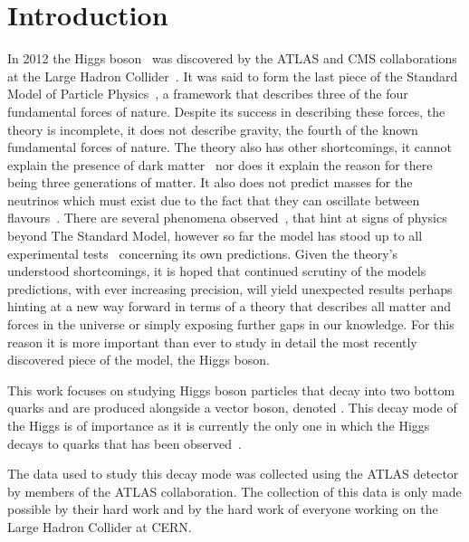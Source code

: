 \chapter{Introduction}%
\label{ch:intro}

In 2012 the Higgs boson~\cite{Brout-Englert, Higgs:1964, Kibble} was discovered
by the ATLAS and CMS collaborations at the Large Hadron
Collider~\cite{DiscoHiggsATLAS, DiscoHiggsCMS}. It was said to form the last
piece of the Standard Model of Particle Physics~\cite{Glashow1959, Salam:1968,
Weinberg:1967, GellMann:1962}, a framework that describes three of the four
fundamental forces of nature. Despite its success in describing these forces,
the theory is incomplete, it does not describe gravity, the fourth of the known
fundamental forces of nature. The theory also has other shortcomings, it cannot
explain the presence of dark matter~\cite{DM-ev-sloan, DM-ev-nucleosynth,
  DM-ev-supernova, DM-ev-scaffold, DM-ev-direct, DM-ev-strong-lens,
  DM-ev-candidates, DM-ev-PDG, DM-ev-Zwicky, DM-ev-nonbaryonic, DM-ev-particle}
nor does it explain the reason for there being three generations of matter. It
also does not predict masses for the neutrinos which must exist due to the fact
that they can oscillate between flavours~\cite{nu-osc-1, nu-osc-2, nu-osc-3}.
There are several phenomena observed~\cite{anom-BD-branching, anom-Dtau-excess,
  anom-g-2, anom-proton-radius, anom-bsll-trans}, that hint at signs of physics
beyond The Standard Model, however so far the model has stood up to all
experimental tests~\cite{EWtests, 1998-SMtests} concerning its own predictions.
Given the theory's understood shortcomings, it is hoped that continued
scrutiny of the models predictions, with ever increasing precision, will yield
unexpected results perhaps hinting at a new way forward in terms of a theory
that describes all matter and forces in the universe or simply exposing further
gaps in our knowledge. For this reason it is more important than ever to study
in detail the most recently discovered piece of the model, the Higgs boson.

This work focuses on studying Higgs boson particles that decay into two bottom
quarks and are produced alongside a vector boson, denoted \VHbb. This decay mode
of the Higgs is of importance as it is currently the only one in which the Higgs
decays to quarks that has been observed~\cite{vhbb-obs}.

The data used to study this decay mode was collected using the ATLAS detector by
members of the ATLAS collaboration. The collection of this data is only made
possible by their hard work and by the hard work of everyone working on the
Large Hadron Collider at CERN.

